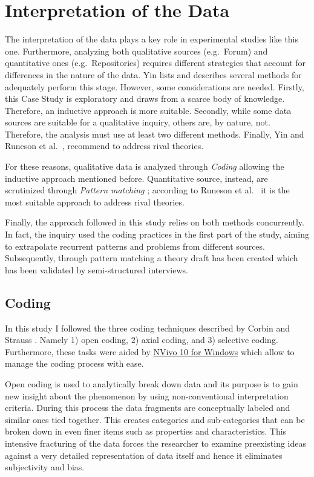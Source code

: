 %
%
%
%
\section{Interpretation of the Data} \label{data_interpretation}

The interpretation of the data plays a key role in experimental studies like this one. Furthermore, analyzing both qualitative sources (e.g.\ Forum) and quantitative ones (e.g.\ Repositories) requires different strategies that account for differences in the nature of the data. Yin \cite{case_study_guide} lists and describes several methods for adequately perform this stage. However, some considerations are needed. Firstly, this Case Study is exploratory and draws from a scarce body of knowledge. Therefore, an inductive approach is more suitable. Secondly, while some data sources are suitable for a qualitative inquiry, others are, by nature, not. Therefore, the analysis must use at least two different methods. Finally, Yin \cite{case_study_guide} and Runeson et al.\ \cite{case_study_software_engineering}, recommend to address rival theories.   

For these reasons, qualitative data is analyzed through \textit{Coding} \cite{qualitative_inquiry} allowing the inductive approach mentioned before. Quantitative source, instead, are scrutinized through \textit{Pattern matching} \cite{case_study_guide}; according to Runeson et al.\ \cite{case_study_software_engineering} it is the most suitable approach to address rival theories.

Finally, the approach followed in this study relies on both methods concurrently. In fact, the inquiry used the coding practices in the first part of the study, aiming to extrapolate recurrent patterns and problems from different sources. Subsequently, through pattern matching a theory draft has been created which has been validated by semi-structured interviews.

\subsection{Coding}
In this study I followed the three coding techniques described by Corbin and Strauss \cite{coding_guidelines}. Namely 1) open coding, 2) axial coding, and 3) selective coding. Furthermore, these tasks were aided by \href{http://www.qsrinternational.com/products_nvivo.aspx}{NVivo 10 for Windows} which allow to manage the coding process with ease.

Open coding is used to analytically break down data and its purpose is to gain new insight about the phenomenon by using non-conventional interpretation criteria. During this process the data fragments are conceptually labeled and similar ones tied together. This creates categories and sub-categories that can be broken down in even finer items such as properties and characteristics. This intensive fracturing of the data forces the researcher to examine preexisting ideas against a very detailed representation of data itself and hence it eliminates subjectivity and bias.

